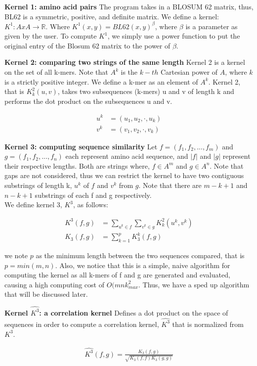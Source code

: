 \documentclass{article}
\begin{document}
\textbf{Kernel 1: amino acid pairs}
The program takes in a BLOSUM 62 matrix, thus, BL62 is a symmetric, positive, and definite matrix. 
We define a kernel: $K^1 \colon A x A \to \mathbb{R}$. Where $K^1(x, y) = BL62(x, y)^β$, where $\beta$ is a parameter as given by the user. To compute $K^1$, we simply use a power function to put the original entry of the Blosum 62 matrix to the power of $\beta$. 

\textbf{Kernel 2: comparing two strings of the same length}
Kernel 2 is a kernel on the set of all k-mers. Note that $A^k$ is the $k-th$ Cartesian power of $A$, where $k$ is a strictly positive integer. We define a k-mer as an element of $A^k$. 
Kernel 2,  that is $K^2_k (u, v)$, takes two subsequences (k-mers) u and v of length k and performs the dot product on the subsequences u and v.
\begin{center}
\begin{align*} 
u^k &=  (u_1, u_2, \cdot, u_k) \\ 
v^k &=  (v_1, v_2, \cdot, v_k)
\end{align*}
\end{center}

\textbf{Kernel 3: computing sequence similarity}
Let $f = (f_1, f_2,...,f_m)$ and $g = (f_1, f_2,...,f_n)$ each represent amino acid sequence, and $|f|$ and  $|g|$ represent their respective lengths. Both are strings where, $f \in A^m$ and $g \in A^n$. Note that gaps are not considered, thus we can restrict the kernel to have two contiguous substrings of length k, $u^k$ of $f$ and $v^k$ from $g$. Note that there are $m - k+1$ and $n-k+1$ substrings of each f and g respectively. \\
We define kernel 3, $K^3$, as follows: 
\begin{center}
\begin{align*} 
K^3(f,g) &= \sum_{u^k \in f}\sum_{v^k \in g} K^2_k(u^k,v^k) \\
K_3(f,g) &= \sum_{k=1}^p K_3^k(f,g)
\end{align*}
\end{center}
we note $p$ as the minimum length between the two sequences compared, that is $p = min(m,n)$. Also, we notice that this is a simple, naive algorithm for computing the kernel as all k-mers of f and g are generated and evaluated, causing a high computing cost of $O(mnk^2_{max}$. Thus, we have a sped up algorithm that will be discussed later. 

\textbf{Kernel $\hat{K^3}$: a correlation kernel}
Defines a dot product on the space of sequences in order to compute a correlation kernel, $\hat{K^3}$ that is normalized from $K^3$. 
\begin{center}
\begin{align*} 
\hat{K^3}(f,g) = \frac{K_3(f,g)}{\sqrt{K_3(f,f)K_3(g,g)}}
\end{align*}
\end{center}
\end{document}
